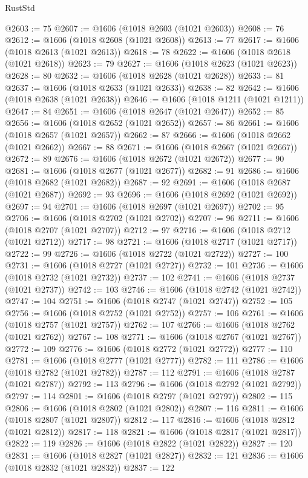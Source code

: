 \begin{lexlean}{RustStd}
\begin{coremodule}
{\begin{coremodule}
{{{{{{{{{{{{{{{{{{{{{{{{{{{{{{{{{{{{{{{{{{{{{{{{{{{{{{{{{{{{{{{{{{{{@2603 := 75
@2607 := @1606 (@1018 @2603 (@1021 @2603))
@2608 := 76
@2612 := @1606 (@1018 @2608 (@1021 @2608))
@2613 := 77
@2617 := @1606 (@1018 @2613 (@1021 @2613))
@2618 := 78
@2622 := @1606 (@1018 @2618 (@1021 @2618))
@2623 := 79
@2627 := @1606 (@1018 @2623 (@1021 @2623))
@2628 := 80
@2632 := @1606 (@1018 @2628 (@1021 @2628))
@2633 := 81
@2637 := @1606 (@1018 @2633 (@1021 @2633))
@2638 := 82
@2642 := @1606 (@1018 @2638 (@1021 @2638))
@2646 := @1606 (@1018 @1211 (@1021 @1211))
@2647 := 84
@2651 := @1606 (@1018 @2647 (@1021 @2647))
@2652 := 85
@2656 := @1606 (@1018 @2652 (@1021 @2652))
@2657 := 86
@2661 := @1606 (@1018 @2657 (@1021 @2657))
@2662 := 87
@2666 := @1606 (@1018 @2662 (@1021 @2662))
@2667 := 88
@2671 := @1606 (@1018 @2667 (@1021 @2667))
@2672 := 89
@2676 := @1606 (@1018 @2672 (@1021 @2672))
@2677 := 90
@2681 := @1606 (@1018 @2677 (@1021 @2677))
@2682 := 91
@2686 := @1606 (@1018 @2682 (@1021 @2682))
@2687 := 92
@2691 := @1606 (@1018 @2687 (@1021 @2687))
@2692 := 93
@2696 := @1606 (@1018 @2692 (@1021 @2692))
@2697 := 94
@2701 := @1606 (@1018 @2697 (@1021 @2697))
@2702 := 95
@2706 := @1606 (@1018 @2702 (@1021 @2702))
@2707 := 96
@2711 := @1606 (@1018 @2707 (@1021 @2707))
@2712 := 97
@2716 := @1606 (@1018 @2712 (@1021 @2712))
@2717 := 98
@2721 := @1606 (@1018 @2717 (@1021 @2717))
@2722 := 99
@2726 := @1606 (@1018 @2722 (@1021 @2722))
@2727 := 100
@2731 := @1606 (@1018 @2727 (@1021 @2727))
@2732 := 101
@2736 := @1606 (@1018 @2732 (@1021 @2732))
@2737 := 102
@2741 := @1606 (@1018 @2737 (@1021 @2737))
@2742 := 103
@2746 := @1606 (@1018 @2742 (@1021 @2742))
@2747 := 104
@2751 := @1606 (@1018 @2747 (@1021 @2747))
@2752 := 105
@2756 := @1606 (@1018 @2752 (@1021 @2752))
@2757 := 106
@2761 := @1606 (@1018 @2757 (@1021 @2757))
@2762 := 107
@2766 := @1606 (@1018 @2762 (@1021 @2762))
@2767 := 108
@2771 := @1606 (@1018 @2767 (@1021 @2767))
@2772 := 109
@2776 := @1606 (@1018 @2772 (@1021 @2772))
@2777 := 110
@2781 := @1606 (@1018 @2777 (@1021 @2777))
@2782 := 111
@2786 := @1606 (@1018 @2782 (@1021 @2782))
@2787 := 112
@2791 := @1606 (@1018 @2787 (@1021 @2787))
@2792 := 113
@2796 := @1606 (@1018 @2792 (@1021 @2792))
@2797 := 114
@2801 := @1606 (@1018 @2797 (@1021 @2797))
@2802 := 115
@2806 := @1606 (@1018 @2802 (@1021 @2802))
@2807 := 116
@2811 := @1606 (@1018 @2807 (@1021 @2807))
@2812 := 117
@2816 := @1606 (@1018 @2812 (@1021 @2812))
@2817 := 118
@2821 := @1606 (@1018 @2817 (@1021 @2817))
@2822 := 119
@2826 := @1606 (@1018 @2822 (@1021 @2822))
@2827 := 120
@2831 := @1606 (@1018 @2827 (@1021 @2827))
@2832 := 121
@2836 := @1606 (@1018 @2832 (@1021 @2832))
@2837 := 122
}}}}}}}}}}}}}}}}}}}}}}}}}}}}}}}}}}}}}}}}}}}}}}}}}}}}}}}}}}}}}}}}}}}}
\end{coremodule}}
\end{coremodule}
\end{lexlean}

